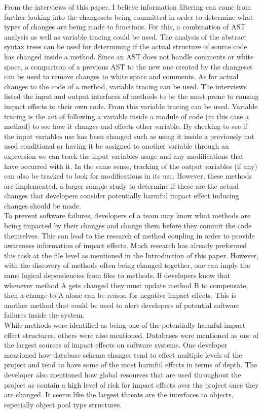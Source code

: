 \documentclass[conference]{IEEEtran}
\begin{document}
From the interviews of this paper, I believe information filtering can come from further 
looking into the changesets being committed in order to determine what types of changes
are being made to functions. For this, a combination of AST analysis as well as variable
tracing could be used. The analysis of the abstract syntax trees can be used for determining
if the actual structure of source code has changed inside a method. Since an AST does not
handle comments or white space, a comparison of a previous AST to the new one created by
the changeset can be used to remove changes to white space and comments. As for actual
changes to the code of a method, variable tracing can be used. The interviews listed the
input and output interfaces of methods to be the most prone to causing impact effects
to their own code. From this variable tracing can be used. Variable tracing is the act of following
a variable inside a module of code (in this case a method) to see how it changes and effects
other variable. By checking to see if the input variables use has been changed such as
using it inside a previously not used conditional or having it be assigned to another variable
through an expression we can track the input variables usage and any modifications that
have occurred with it. In the same sense, tracking of the output variables (if any) can 
also be tracked to look for modifications in its use. However, these methods are implemented,
a larger sample study to determine if these are the actual changes that developers consider
potentially harmful impact effect inducing changes should be made. \\

To prevent software failures, developers of a team may know what methods are being
impacted by their changes and change them before they commit the code themselves.
This can lead to the research of method coupling in order to provide awareness information
of impact effects. Much research has already preformed this task at the file level as mentioned
in the Introduction of this paper. However, with the discovery of methods often being changed 
together, one can imply the same logical dependencies from files to methods. If developers
know that whenever method A gets changed they must update method B to compensate,
then a change to A alone can be reason for negative impact effects. This is another method
that could be used to alert developers of potential software failures inside the system.\\

While methods were identified as being one of the potentially harmful impact effect
structures, others were also mentioned. Databases were mentioned as one of the largest
sources of impact effects on software systems. One developer mentioned how database
schema changes tend to effect multiple levels of the project and tend to have some of
the most harmful effects in terms of depth. The developer also mentioned how global
resources that are used throughout the project as contain a high level of rick for impact
effects over the project once they are changed. It seems like the largest threats are
the interfaces to objects, especially object pool type structures.\\
\end{document}
